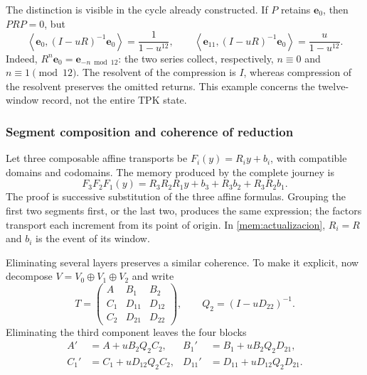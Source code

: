The distinction is visible in the cycle already constructed. If \(P\)
retains \(\mathbf e_0\), then \(PRP=0\), but
\begin{equation}
 \left\langle\mathbf e_0,(I-uR)^{-1}\mathbf e_0\right\rangle
 =\frac1{1-u^{12}},\qquad
 \left\langle\mathbf e_{11},(I-uR)^{-1}\mathbf e_0\right\rangle
 =\frac u{1-u^{12}}.
 \label{mem:ejemplo-ciclo}
\end{equation}
Indeed, \(R^n\mathbf e_0=\mathbf e_{-n\bmod12}\): the two
series collect, respectively, \(n\equiv0\) and
\(n\equiv1\pmod{12}\). The resolvent of the compression is \(I\),
whereas compression of the resolvent preserves the omitted returns.
This example concerns the twelve-window record, not the entire TPK state.

\subsubsection{Segment composition and coherence of reduction}

Let three composable affine transports be
\(F_i(y)=R_i y+b_i\), with compatible domains and codomains.
The memory produced by the complete journey is
\begin{equation}
 F_3F_2F_1(y)
 =R_3R_2R_1y+b_3+R_3b_2+R_3R_2b_1.
 \label{mem:cociclo-tres}
\end{equation}
The proof is successive substitution of the three affine formulas.
Grouping the first two segments first, or the last two, produces the
same expression; the factors transport each increment from its point
of origin. In \eqref{mem:actualizacion},
\(R_i=R\) and \(b_i\) is the event of its window.

Eliminating several layers preserves a similar coherence.
To make it explicit, now decompose
\(V=V_0\oplus V_1\oplus V_2\) and write
\[
 T=\begin{pmatrix}
 A&B_1&B_2\\C_1&D_{11}&D_{12}\\C_2&D_{21}&D_{22}
 \end{pmatrix},\qquad Q_2=(I-uD_{22})^{-1}.
\]
Eliminating the third component leaves the four blocks
\begin{equation}
 \begin{aligned}
 A'&=A+uB_2Q_2C_2,&
 B_1'&=B_1+uB_2Q_2D_{21},\\
 C_1'&=C_1+uD_{12}Q_2C_2,&
 D_{11}'&=D_{11}+uD_{12}Q_2D_{21}.
 \end{aligned}
 \label{mem:schur-intermedio}
\end{equation}

